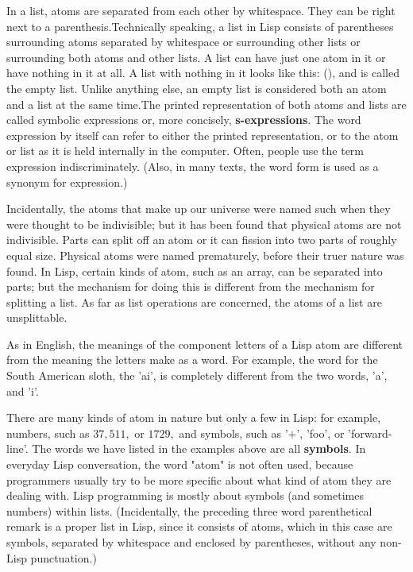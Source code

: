 \documentclass[12pt]{book}
\begin{document}
In a list, atoms are separated from each other by whitespace. They can be right next to a parenthesis.Technically speaking, a list in Lisp consists of parentheses surrounding atoms separated by whitespace or surrounding other lists or surrounding both atoms and other lists. A list can have just one atom in it or have nothing in it at all. A list with nothing in it looks like this: (), and is called the empty list. Unlike anything else, an empty list is considered both an atom and a list at the same time.The printed representation of both atoms and lists are called symbolic expressions or, more concisely, {\bf s-expressions}. The word expression by itself can refer to either the printed representation, or to the atom or list as it is held internally in the computer. Often, people use the term expression indiscriminately. (Also, in many texts, the word form is used as a synonym for expression.)

Incidentally, the atoms that make up our universe were named such when they were thought to be indivisible; but it has been found that physical atoms are not indivisible. Parts can split off an atom or it can fission into two parts of roughly equal size. Physical atoms were named prematurely, before their truer nature was found. In Lisp, certain kinds of atom, such as an array, can be separated into parts; but the mechanism for doing this is different from the mechanism for splitting a list. As far as list operations are concerned, the atoms of a list are unsplittable.

As in English, the meanings of the component letters of a Lisp atom are different from the meaning the letters make as a word. For example, the word for the South American sloth, the 'ai', is completely different from the two words, 'a', and 'i'.

There are many kinds of atom in nature but only a few in Lisp: for example, numbers, such as $37,511,$ or $1729,$ and symbols, such as '$+$', 'foo', or 'forward-line'. The words we have listed in the examples above are all {\bf symbols}. In everyday Lisp conversation, the word "atom" is not often used, because programmers usually try to be more specific about what kind of atom they are dealing with. Lisp programming is mostly about symbols (and sometimes numbers) within lists. (Incidentally, the preceding three word parenthetical remark is a proper list in Lisp, since it consists of atoms, which in this case are symbols, separated by whitespace and enclosed by parentheses, without any non-Lisp punctuation.)
\end{document}
